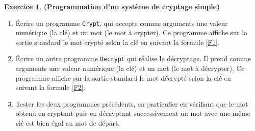 \documentclass[12pt]{article}
\theoremstyle{definition}
\newtheorem{Exercice}{Exercice}
\begin{document}
\begin{Exercice} {\bf (Programmation d'un système de cryptage simple)}
\begin{enumerate}
    \item Écrire un programme {\tt Crypt}, qui accepte comme arguments
    une valeur numérique (la clé) et un mot (le mot à crypter). Ce 
    programme affiche sur la sortie standard le mot crypté selon la clé
    en suivant la formule \eqref{F1}.
    \smallskip

    \item Écrire un autre programme {\tt Decrypt} qui réalise le décryptage.
    Il prend comme arguments une valeur numérique (la clé) et un mot
    (le mot à décrypter). Ce programme affiche sur la sortie standard le
    mot décrypté selon la clé en suivant la formule \eqref{F2}.
    \smallskip

    \item Tester les deux programmes précédents, en particulier en 
    vérifiant que le mot obtenu en cryptant puis en décryptant 
    successivement un mot avec une même clé est bien égal au mot de 
    départ.
\end{enumerate}
\end{Exercice}
\bigskip
\end{document}
